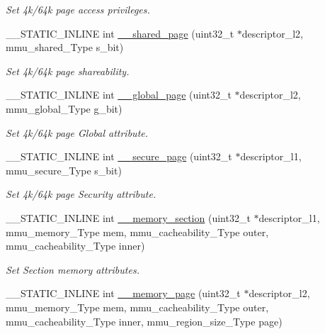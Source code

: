\begin{DoxyCompactItemize}
\begin{DoxyCompactList}\small\item\em Set 4k/64k page access privileges. \end{DoxyCompactList}\item 
\+\_\+\+\_\+\+S\+T\+A\+T\+I\+C\+\_\+\+I\+N\+L\+I\+NE int \hyperlink{group___m_m_u___functions_gae48e2237412f51af7bdbd7d4d3d5125d}{\+\_\+\+\_\+shared\+\_\+page} (uint32\+\_\+t $\ast$descriptor\+\_\+l2, mmu\+\_\+shared\+\_\+\+Type s\+\_\+bit)
\begin{DoxyCompactList}\small\item\em Set 4k/64k page shareability. \end{DoxyCompactList}\item 
\+\_\+\+\_\+\+S\+T\+A\+T\+I\+C\+\_\+\+I\+N\+L\+I\+NE int \hyperlink{group___m_m_u___functions_ga941feca37d9210110e090dc4ecd43ca5}{\+\_\+\+\_\+global\+\_\+page} (uint32\+\_\+t $\ast$descriptor\+\_\+l2, mmu\+\_\+global\+\_\+\+Type g\+\_\+bit)
\begin{DoxyCompactList}\small\item\em Set 4k/64k page Global attribute. \end{DoxyCompactList}\item 
\+\_\+\+\_\+\+S\+T\+A\+T\+I\+C\+\_\+\+I\+N\+L\+I\+NE int \hyperlink{group___m_m_u___functions_ga27417dca4e862ec314c09fd2b89383ff}{\+\_\+\+\_\+secure\+\_\+page} (uint32\+\_\+t $\ast$descriptor\+\_\+l1, mmu\+\_\+secure\+\_\+\+Type s\+\_\+bit)
\begin{DoxyCompactList}\small\item\em Set 4k/64k page Security attribute. \end{DoxyCompactList}\item 
\+\_\+\+\_\+\+S\+T\+A\+T\+I\+C\+\_\+\+I\+N\+L\+I\+NE int \hyperlink{group___m_m_u___functions_ga3883e7cea429d89d07e32fe69b241565}{\+\_\+\+\_\+memory\+\_\+section} (uint32\+\_\+t $\ast$descriptor\+\_\+l1, mmu\+\_\+memory\+\_\+\+Type mem, mmu\+\_\+cacheability\+\_\+\+Type outer, mmu\+\_\+cacheability\+\_\+\+Type inner)
\begin{DoxyCompactList}\small\item\em Set Section memory attributes. \end{DoxyCompactList}\item 
\+\_\+\+\_\+\+S\+T\+A\+T\+I\+C\+\_\+\+I\+N\+L\+I\+NE int \hyperlink{group___m_m_u___functions_ga3eb167ca2d2e63c53a62ac1fb7cde793}{\+\_\+\+\_\+memory\+\_\+page} (uint32\+\_\+t $\ast$descriptor\+\_\+l2, mmu\+\_\+memory\+\_\+\+Type mem, mmu\+\_\+cacheability\+\_\+\+Type outer, mmu\+\_\+cacheability\+\_\+\+Type inner, mmu\+\_\+region\+\_\+size\+\_\+\+Type page)

\end{DoxyCompactItemize}
